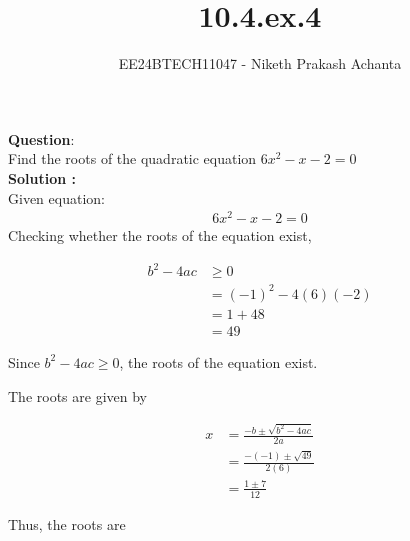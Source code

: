 \documentclass[journal]{IEEEtran}
\begin{document}

\vspace{3cm}

\title{10.4.ex.4}
\author{EE24BTECH11047 - Niketh Prakash Achanta}
{\let\newpage\relax\maketitle}

\renewcommand{\thefigure}{\theenumi}
\renewcommand{\thetable}{\theenumi}
\setlength{\intextsep}{10pt} %

\renewcommand{\thetable}{\theenumi}
\textbf{Question}:\\

Find the roots of the quadratic equation $6x^2 - x - 2 = 0$ \\

\textbf{Solution : }\\
Given equation:
\begin{align}
    6x^2 - x - 2 = 0 
\end{align}
Checking whether the roots of the equation exist,

\begin{align}
b^2 - 4ac &\geq 0 \\
&= (-1)^2 - 4(6)(-2) \\
&= 1 + 48 \\
&= 49
\end{align}

Since \( b^2 - 4ac \geq 0 \), the roots of the equation exist.

The roots are given by

\begin{align}
x &= \frac{-b \pm \sqrt{b^2 - 4ac}}{2a} \\
&= \frac{-(-1) \pm \sqrt{49}}{2(6)} \\
&= \frac{1 \pm 7}{12}
\end{align}

Thus, the roots are
\end{document}
